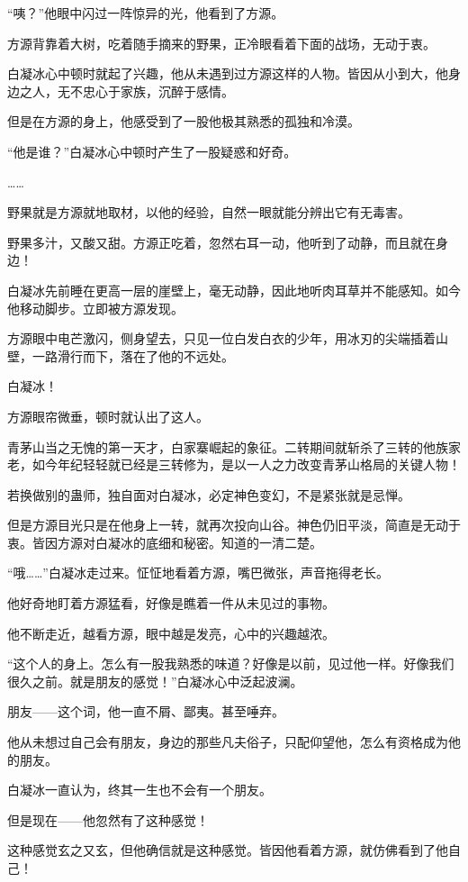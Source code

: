 \begin{this_body}
“咦？”他眼中闪过一阵惊异的光，他看到了方源。

方源背靠着大树，吃着随手摘来的野果，正冷眼看着下面的战场，无动于衷。

白凝冰心中顿时就起了兴趣，他从未遇到过方源这样的人物。皆因从小到大，他身边之人，无不忠心于家族，沉醉于感情。

但是在方源的身上，他感受到了一股他极其熟悉的孤独和冷漠。

“他是谁？”白凝冰心中顿时产生了一股疑惑和好奇。

……

野果就是方源就地取材，以他的经验，自然一眼就能分辨出它有无毒害。

野果多汁，又酸又甜。方源正吃着，忽然右耳一动，他听到了动静，而且就在身边！

白凝冰先前睡在更高一层的崖壁上，毫无动静，因此地听肉耳草并不能感知。如今他移动脚步。立即被方源发现。

方源眼中电芒激闪，侧身望去，只见一位白发白衣的少年，用冰刃的尖端插着山壁，一路滑行而下，落在了他的不远处。

白凝冰！

方源眼帘微垂，顿时就认出了这人。

青茅山当之无愧的第一天才，白家寨崛起的象征。二转期间就斩杀了三转的他族家老，如今年纪轻轻就已经是三转修为，是以一人之力改变青茅山格局的关键人物！

若换做别的蛊师，独自面对白凝冰，必定神色变幻，不是紧张就是忌惮。

但是方源目光只是在他身上一转，就再次投向山谷。神色仍旧平淡，简直是无动于衷。皆因方源对白凝冰的底细和秘密。知道的一清二楚。

“哦……”白凝冰走过来。怔怔地看着方源，嘴巴微张，声音拖得老长。

他好奇地盯着方源猛看，好像是瞧着一件从未见过的事物。

他不断走近，越看方源，眼中越是发亮，心中的兴趣越浓。

“这个人的身上。怎么有一股我熟悉的味道？好像是以前，见过他一样。好像我们很久之前。就是朋友的感觉！”白凝冰心中泛起波澜。

朋友——这个词，他一直不屑、鄙夷。甚至唾弃。

他从未想过自己会有朋友，身边的那些凡夫俗子，只配仰望他，怎么有资格成为他的朋友。

白凝冰一直认为，终其一生也不会有一个朋友。

但是现在——他忽然有了这种感觉！

这种感觉玄之又玄，但他确信就是这种感觉。皆因他看着方源，就仿佛看到了他自己！


\end{this_body}
